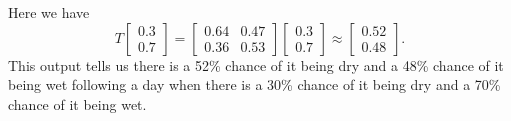 \begin{example}
	\item Here we have 
\[T\left[ \begin{array}{c} 0.3\\0.7 \end{array}\right]  = \left[ \begin{array}{cc} 0.64&0.47 \\ 0.36&0.53 \end{array} \right] \left[ \begin{array}{c} 0.3\\0.7 \end{array}\right]  \approx \left[ \begin{array}{c} 0.52\\0.48 \end{array}\right].\]
This output tells us there is a 52\% chance of it being dry and a 48\% chance of it being wet following a day when there is a 30\% chance of it being dry and a 70\% chance of it being wet. 


\end{example}
